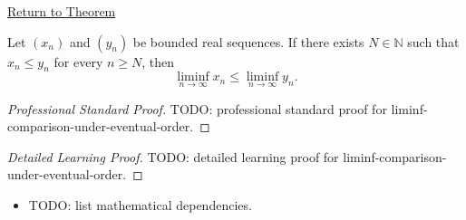 \newpage
{}
\label{prf:liminf-comparison-under-eventual-order}

\begin{remark*}[Return]
\hyperref[thm:liminf-comparison-under-eventual-order]{Return to Theorem}
\end{remark*}

\begin{theorem*}
Let $(x_n)$ and $(y_n)$ be bounded real sequences. If there exists
$N\in\mathbb{N}$ such that $x_n\le y_n$ for every $n\ge N$, then
\[
  \liminf_{n\to\infty}x_n
  \le
  \liminf_{n\to\infty}y_n.
\]

\smallskip
\noindent
\end{theorem*}

\begin{proof}[Professional Standard Proof]
\LRAProofBodyStart
TODO: professional standard proof for liminf-comparison-under-eventual-order.
\end{proof}

\begin{proof}[Detailed Learning Proof]
\LRAProofBodyStart
TODO: detailed learning proof for liminf-comparison-under-eventual-order.
\end{proof}

\begin{remark*}
\end{remark*}

\begin{dependencies}
\begin{itemize}
  \item TODO: list mathematical dependencies.
\end{itemize}
\end{dependencies}

\clearpage

